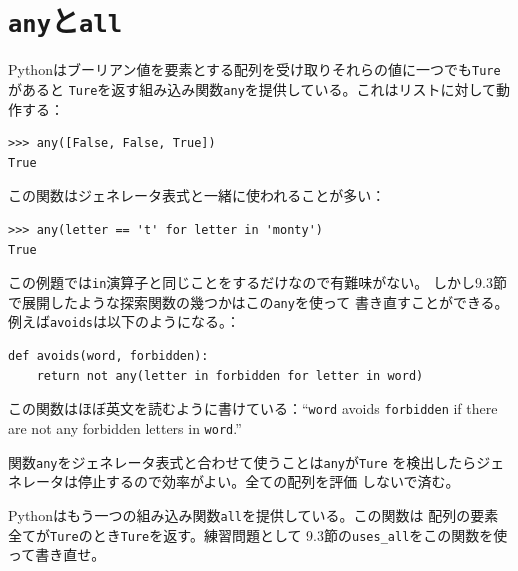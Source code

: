 \documentclass[a4j,12pt,makeidx]{jbook}
\begin{document}
\section{{\tt any}と{\tt all}}
Pythonはブーリアン値を要素とする配列を受け取りそれらの値に一つでも{\tt Ture}があると
{\tt Ture}を返す組み込み関数{\tt any}を提供している。これはリストに対して動作する：
\begin{verbatim}
>>> any([False, False, True])
True
\end{verbatim}
この関数はジェネレータ表式と一緒に使われることが多い：
\begin{verbatim}
>>> any(letter == 't' for letter in 'monty')
True
\end{verbatim}
この例題では{\tt in}演算子と同じことをするだけなので有難味がない。
しかし9.3節で展開したような探索関数の幾つかはこの{\tt any}を使って
書き直すことができる。例えば{\tt avoids}は以下のようになる。：
\begin{verbatim}
def avoids(word, forbidden):
    return not any(letter in forbidden for letter in word)
\end{verbatim}
この関数はほぼ英文を読むように書けている：``{\tt word} avoids
{\tt forbidden} if there are not any forbidden letters in {\tt word}.''\par
関数{\tt any}をジェネレータ表式と合わせて使うことは{\tt any}が{\tt Ture}
を検出したらジェネレータは停止するので効率がよい。全ての配列を評価
しないで済む。\par
Pythonはもう一つの組み込み関数{\tt all}を提供している。この関数は
配列の要素全てが{\tt Ture}のとき{\tt Ture}を返す。練習問題として
9.3節の{\tt uses\_all}をこの関数を使って書き直せ。
%
\end{document}
